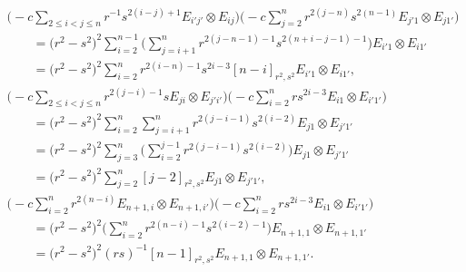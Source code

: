 \documentclass[10pt,a4paper]{amsart}
\numberwithin{equation}{section}
\begin{document}
\begin{gather}
\\
 \Biggl(-c\sum_{2 \le i < j \le n}r^{-1}s^{2(i - j) + 1}E_{i'j'} \otimes E_{ij} \Biggr)\Biggl(-c\sum_{j = 2}^{n}r^{2(j - n)}s^{2(n - 1)}E_{j'1} \otimes E_{j1'} \Biggr) \nonumber\\
 \qquad{}=
 \bigl(r^{2} - s^{2}\bigr)^{2}\sum_{i = 2}^{n-1}\Biggl(\sum_{j = i + 1}^{n}r^{2(j - n - 1) - 1}s^{2(n + i - j - 1) - 1}\Biggr)E_{i'1} \otimes E_{i1'} \nonumber\\
 \qquad{}=
 \bigl(r^{2} - s^{2}\bigr)^{2}\sum_{i = 2}^{n}r^{2(i - n) - 1}s^{2i - 3}[n - i]_{r^{2},s^{2}}E_{i'1} \otimes E_{i1'},\label{eq:term_e}
\\
 \Biggl(-c\sum_{2 \le i < j \le n}r^{2(j - i) - 1}sE_{ji} \otimes E_{j'i'} \Biggr)\Biggl(-c\sum_{i = 2}^{n}rs^{2i - 3}E_{i1} \otimes E_{i'1'}\Biggr) \nonumber\\
 \qquad{}=
 \bigl(r^{2} - s^{2}\bigr)^{2}\sum_{i = 2}^{n}\sum_{j = i + 1}^{n}r^{2(j - i - 1)}s^{2(i -2)}E_{j1} \otimes E_{j'1'} \nonumber\\
 \qquad{}=
 \bigl(r^{2} - s^{2}\bigr)^{2}\sum_{j = 3}^{n}\Biggl( \sum_{i = 2}^{j - 1}r^{2(j - i - 1)}s^{2(i - 2)}\Biggr) E_{j1} \otimes E_{j'1'} \nonumber\\
 \qquad{}=
 \bigl(r^{2} - s^{2}\bigr)^{2}\sum_{j = 2}^{n}[j - 2]_{r^{2},s^{2}}E_{j1} \otimes E_{j'1'},\label{eq:term_f}
\\
 \Biggl(-c\sum_{i = 2}^{n}r^{2(n - i)}E_{n + 1,i} \otimes E_{n + 1,i'} \Biggr) \Biggl(-c\sum_{i = 2}^{n}rs^{2i - 3}E_{i1} \otimes E_{i'1'}\Biggr) \nonumber\\
 \qquad{}=
 \bigl(r^{2} - s^{2}\bigr)^{2}\Biggl(\sum_{i = 2}^{n}r^{2(n - i) - 1}s^{2(i - 2) - 1}\Biggr)E_{n+1,1} \otimes E_{n + 1,1'} \nonumber\\
 \qquad{}=
 \bigl(r^{2} - s^{2}\bigr)^{2}(rs)^{-1}[n - 1]_{r^{2},s^{2}}E_{n + 1,1} \otimes E_{n + 1,1'}.\label{eq:term_g}
\end{gather}
\end{document}
